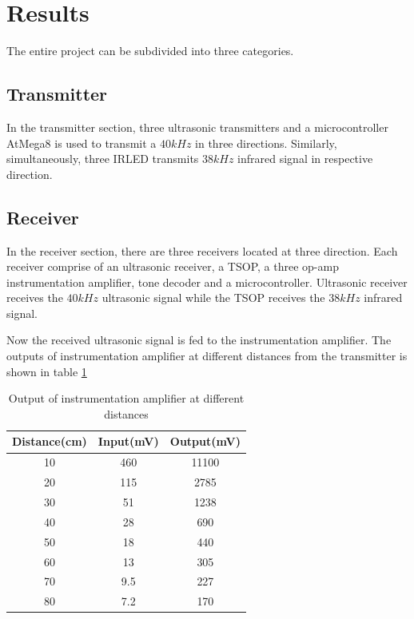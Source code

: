 \section{Results}

The entire project can be subdivided into three categories.

\subsection{Transmitter}
In the transmitter section, three ultrasonic transmitters and a microcontroller AtMega8 is used to transmit a $40kHz$ in three directions. Similarly, simultaneously, three IRLED transmits $38kHz$ infrared signal in respective direction.


\subsection{Receiver}
In the receiver section, there are three receivers located at three direction. Each receiver comprise of an ultrasonic receiver, a TSOP, a three op-amp instrumentation amplifier, tone decoder and a microcontroller. Ultrasonic receiver receives the $40kHz$ ultrasonic signal while the TSOP receives the $38kHz$ infrared signal. 

Now the received ultrasonic signal is fed to the instrumentation amplifier. The outputs of instrumentation amplifier at different distances from the transmitter is shown in table \ref{tab:OpampOutput}
\begin{table}[htpb]
	\centering
	\caption{Output of instrumentation amplifier at different distances}
	\label{tab:OpampOutput}
	\begin{tabular}{|c|c|c|}
	\hline 
	Distance(cm) & Input(mV) & Output(mV) \\ 
	\hline 
	10 & 460 & 11100 \\ 
	\hline 
	20 & 115 & 2785 \\ 
	\hline 
	30 & 51 & 1238 \\ 
	\hline 
	40 & 28 & 690 \\ 
	\hline 
	50 & 18 & 440 \\ 
	\hline 
	60 & 13 & 305 \\ 
	\hline 
	70 & 9.5 & 227 \\ 
	\hline 
	80 & 7.2 & 170 \\ 
	\hline 
	\end{tabular} 
\end{table}

